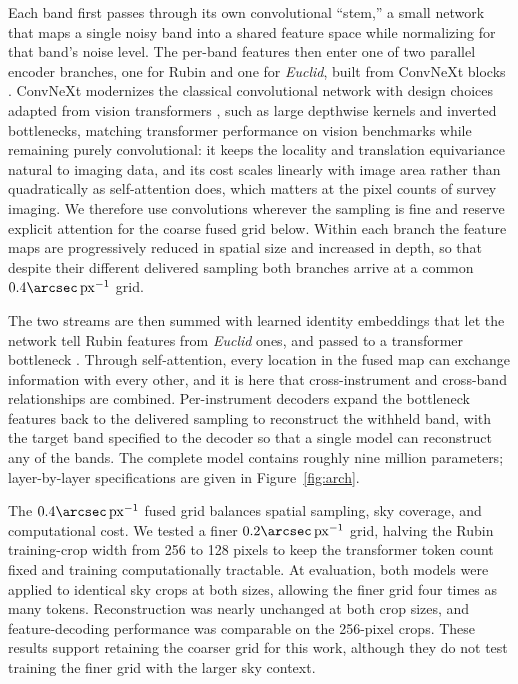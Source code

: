 \documentclass[twocolumn,linenumbers]{aastex701}
\newcommand{\arcsecpx}{\arcsec\,\mathrm{px}^{-1}}
\begin{document}
Each band first passes through its own convolutional ``stem,'' a small network that maps a single noisy band into a shared feature space while normalizing for that band's noise level. The per-band features then enter one of two parallel encoder branches, one for Rubin and one for \textit{Euclid}, built from ConvNeXt blocks \citep{liu2022,convnext}. ConvNeXt modernizes the classical convolutional network with design choices adapted from vision transformers \citep{ViT}, such as large depthwise kernels and inverted bottlenecks, matching transformer performance on vision benchmarks while remaining purely convolutional: it keeps the locality and translation equivariance natural to imaging data, and its cost scales linearly with image area rather than quadratically as self-attention does, which matters at the pixel counts of survey imaging. We therefore use convolutions wherever the sampling is fine and reserve explicit attention for the coarse fused grid below. Within each branch the feature maps are progressively reduced in spatial size and increased in depth, so that despite their different delivered sampling both branches arrive at a common $0.4\arcsecpx$ grid.

The two streams are then summed with learned identity embeddings that let the network tell Rubin features from \textit{Euclid} ones, and passed to a transformer bottleneck \citep[][]{transformers}. Through self-attention, every location in the fused map can exchange information with every other, and it is here that cross-instrument and cross-band relationships are combined. Per-instrument decoders expand the bottleneck features back to the delivered sampling to reconstruct the withheld band, with the target band specified to the decoder so that a single model can reconstruct any of the bands. The complete model contains roughly nine million parameters; layer-by-layer specifications are given in Figure~\ref{fig:arch}.

The $0.4\arcsecpx$ fused grid balances spatial sampling, sky coverage, and computational cost. We tested a finer $0.2\arcsecpx$ grid, halving the Rubin training-crop width from 256 to 128 pixels to keep the transformer token count fixed and training computationally tractable. At evaluation, both models were applied to identical sky crops at both sizes, allowing the finer grid four times as many tokens. Reconstruction was nearly unchanged at both crop sizes, and feature-decoding performance was comparable on the 256-pixel crops. These results support retaining the coarser grid for this work, although they do not test training the finer grid with the larger sky context.
\end{document}
